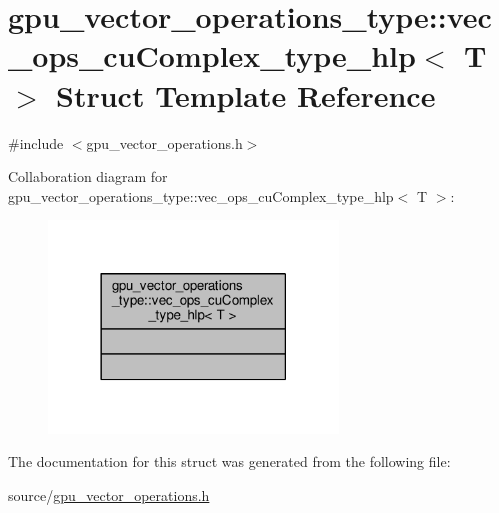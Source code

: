\hypertarget{structgpu__vector__operations__type_1_1vec__ops__cuComplex__type__hlp}{\section{gpu\-\_\-vector\-\_\-operations\-\_\-type\-:\-:vec\-\_\-ops\-\_\-cu\-Complex\-\_\-type\-\_\-hlp$<$ T $>$ Struct Template Reference}
\label{structgpu__vector__operations__type_1_1vec__ops__cuComplex__type__hlp}
}


{\ttfamily \#include $<$gpu\-\_\-vector\-\_\-operations.\-h$>$}



Collaboration diagram for gpu\-\_\-vector\-\_\-operations\-\_\-type\-:\-:vec\-\_\-ops\-\_\-cu\-Complex\-\_\-type\-\_\-hlp$<$ T $>$\-:\nopagebreak
\begin{figure}[H]
\begin{center}
\leavevmode
\includegraphics[width=218pt]{structgpu__vector__operations__type_1_1vec__ops__cuComplex__type__hlp__coll__graph}
\end{center}
\end{figure}


The documentation for this struct was generated from the following file\-:\begin{DoxyCompactItemize}
\item 
source/\hyperlink{gpu__vector__operations_8h}{gpu\-\_\-vector\-\_\-operations.\-h}\end{DoxyCompactItemize}
